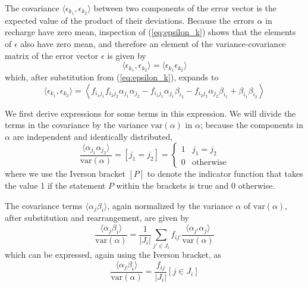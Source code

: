 \documentclass[11pt,a4paper]{article}
\begin{document}
The covariance $\langle \epsilon_{k_1}, \epsilon_{k_2} \rangle$ between two
components of the error vector is the expected value of the product of
their deviations.  Because the errors $\mathbb{\alpha}$ in recharge
have zero mean, inspection of (\ref{eq:epsilon_k}) shows that the
elements of $\mathbb{\epsilon}$ also have zero mean, and therefore an
element of the variance-covariance matrix of the error vector
$\mathbb\epsilon$ is given by
\begin{equation}
  \label{eq:epsilon_covariance}
  \langle \epsilon_{k_1}, \epsilon_{k_2} \rangle = \langle \epsilon_{k_1} \epsilon_{k_2}\rangle
\end{equation}
which, after substitution from (\ref{eq:epsilon_k}), expands to
\begin{equation}
  \label{eq:epsilon_covariance_terms}
  \langle \epsilon_{k_1}, \epsilon_{k_2} \rangle = \left\langle f_{i_1 j_1} f_{i_2 j_2} \alpha_{j_1}\alpha_{j_2} - f_{i_1 j_1}\alpha_{j_1}\beta_{i_2} - f_{i_2 j_2}\alpha_{j_2}\beta_{i_1} + \beta_{i_1}\beta_{i_2} \right\rangle
\end{equation}

We first derive expressions for some terms in this expression.  We
will divide the terms in the covariance by the variance $\text{var}(\alpha)$ in
$\alpha$; because the components in $\alpha$ are independent and
identically distributed,
\begin{equation}
  \label{eq:alpha_correlation}
  \frac{\langle \alpha_{j_1} \alpha_{j_2}\rangle}{\text{var}(\alpha)} = [j_1 = j_2] =
  \begin{cases}
    1 & j_1 = j_2\\
    0 & \text{otherwise}
  \end{cases}
\end{equation}
where we use the Iverson bracket $[P]$ to denote the indicator
function that takes the value 1 if the statement $P$ within the
brackets is true and 0 otherwise.

The covariance terms $\langle \alpha_j\beta_i\rangle$, again
normalized by the variance $\alpha$ of $\text{var}(\alpha)$, after substitution
and rearrangement, are given by
\begin{equation}
  \frac{\langle \alpha_j\beta_i\rangle}{\text{var}(\alpha)} = \frac{1}{|J_i|}\sum_{j' \in J_i} f_{ij'} \frac{\langle\alpha_{j'} \alpha_j\rangle}{\text{var}(\alpha)}
\end{equation}
which can be expressed, again using the Iverson bracket, as
\begin{equation}
  \label{eq:alpha_beta_covariance}
  \frac{\langle \alpha_j\beta_i\rangle}{\text{var}(\alpha)} = \frac{f_{ij}}{|J_i|} [j \in J_i]
\end{equation}
\end{document}
